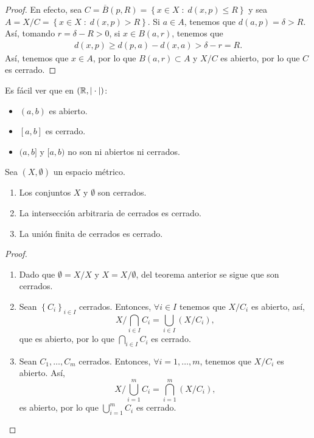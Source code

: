 \begin{proof}
En efecto, sea $\displaystyle C = \overline{B}\left(p, R\right) = \left\{ x \in X \; : \; d\left(x,p\right) \leq R\right\}  $ y sea $\displaystyle A = X/C = \left\{ x \in X \; : \; d\left(x, p\right) > R\right\}  $. Si $\displaystyle a \in A $, tenemos que $\displaystyle d\left(a,p\right) = \delta > R $. Así, tomando $\displaystyle r = \delta - R > 0 $, si $\displaystyle x\in B\left(a,r\right)  $, tenemos que 
	 \[
	 \begin{split}
	 d\left(x,p\right) \geq d\left(p,a\right)- d\left(x,a\right) > \delta - r = R.
	 \end{split}
	 \]
	 Así, tenemos que $\displaystyle x \in A $, por lo que $\displaystyle B\left(a,r\right) \subset A $ y $\displaystyle X/C $ es abierto, por lo que $\displaystyle C $ es cerrado.
\end{proof}
\begin{observation}
Es fácil ver que en $\displaystyle \left(\mathbb{R}, | \cdot |\right) $:
\begin{itemize}
\item $\displaystyle \left(a,b\right) $ es abierto.
\item $\displaystyle \left[a,b\right]  $ es cerrado.
\item $\displaystyle (a,b]  $ y $\displaystyle [a,b) $ no son ni abiertos ni cerrados.
\end{itemize}
\end{observation}
\begin{theorem}
Sea $\displaystyle \left(X, \emptyset\right) $ un espacio métrico.
\begin{enumerate}
\item Los conjuntos $\displaystyle X $ y $\displaystyle \emptyset $ son cerrados.
\item La intersección arbitraria de cerrados es cerrado.
\item La unión finita de cerrados es cerrado.
\end{enumerate}
\end{theorem}
\begin{proof}
\begin{enumerate}
\item Dado que $\displaystyle \emptyset = X/X $ y $\displaystyle X = X/\emptyset $, del teorema anterior se sigue que son cerrados.
\item Sean $\displaystyle \left\{ C_{i}\right\} _{i \in I} $ cerrados. Entonces, $\displaystyle \forall i \in I $ tenemos que $\displaystyle X/C_{i} $ es abierto, así,
	\[X/\bigcap_{i \in I}C_{i} = \bigcup_{i \in I}\left(X/C_{i}\right) ,\]
	que es abierto, por lo que $\displaystyle \bigcap_{i \in I}C_{i} $ es cerrado.
\item Sean $\displaystyle C_{1}, \ldots, C_{m} $ cerrados. Entonces, $\displaystyle \forall i = 1, \ldots, m $, tenemos que $\displaystyle X/C_{i} $ es abierto. Así,
	\[X/\bigcup_{i = 1}^{m}C_{i} = \bigcap_{i = 1}^{m}\left(X/C_{i}\right) ,\]
	es abierto, por lo que $\displaystyle \bigcup_{i = 1}^{m}C_{i} $ es cerrado.
\end{enumerate}
\end{proof}
